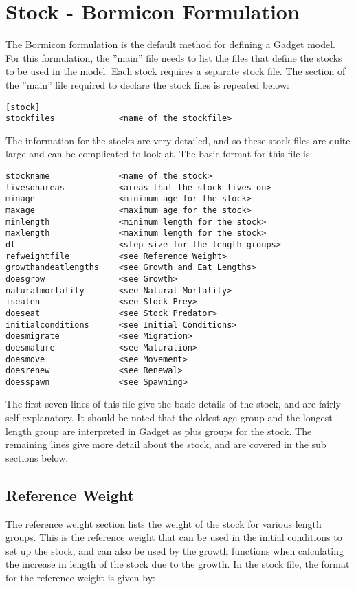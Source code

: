 \documentclass [a4paper, 10pt]{book}
\begin{document}
\section{Stock - Bormicon Formulation}\label{sec:bormstock}
The Bormicon formulation is the default method for defining a Gadget model.  For this formulation, the ''main'' file needs to list the files that define the stocks to be used in the model.  Each stock requires a separate stock file.  The section of the ''main'' file required to declare the stock files is repeated below:

\begin{verbatim}
[stock]
stockfiles             <name of the stockfile>
\end{verbatim}

The information for the stocks are very detailed, and so these stock files are quite large and can be complicated to look at.  The basic format for this file is:

\begin{verbatim}
stockname              <name of the stock>
livesonareas           <areas that the stock lives on>
minage                 <minimum age for the stock>
maxage                 <maximum age for the stock>
minlength              <minimum length for the stock>
maxlength              <maximum length for the stock>
dl                     <step size for the length groups>
refweightfile          <see Reference Weight>
growthandeatlengths    <see Growth and Eat Lengths>
doesgrow               <see Growth>
naturalmortality       <see Natural Mortality>
iseaten                <see Stock Prey>
doeseat                <see Stock Predator>
initialconditions      <see Initial Conditions>
doesmigrate            <see Migration>
doesmature             <see Maturation>
doesmove               <see Movement>
doesrenew              <see Renewal>
doesspawn              <see Spawning>
\end{verbatim}

The first seven lines of this file give the basic details of the stock, and are fairly self explanatory.  It should be noted that the oldest age group and the longest length group are interpreted in Gadget as plus groups for the stock.  The remaining lines give more detail about the stock, and are covered in the sub sections below.

\subsection{Reference Weight}\label{subsec:stockrefweight}
The reference weight section lists the weight of the stock for various length groups.  This is the reference weight that can be used in the initial conditions to set up the stock, and can also be used by the growth functions when calculating the increase in length of the stock due to the growth.  In the stock file, the format for the reference weight is given by:
\end{document}
